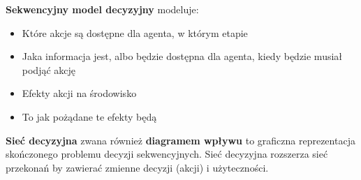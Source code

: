 \documentclass[a4paper, 12pt,oneside]{book}
\begin{document}
\textbf{Sekwencyjny model decyzyjny} modeluje:
\begin{itemize}
	\setlength\itemsep{-0.4em}
	\item Które akcje są dostępne dla agenta, w którym etapie
	\item Jaka informacja jest, albo będzie dostępna dla agenta, kiedy
		będzie musiał podjąć akcję
	\item Efekty akcji na środowisko
	\item To jak pożądane te efekty będą
\end{itemize}

\textbf{Sieć decyzyjna} zwana również \textbf{diagramem wpływu} to graficzna
reprezentacja skończonego problemu decyzji
sekwencyjnych\cite{ai_foundations_decision_networks}. Sieć decyzyjna
rozszerza sieć przekonań by zawierać zmienne decyzji (akcji) i użyteczności.
\end{document}
